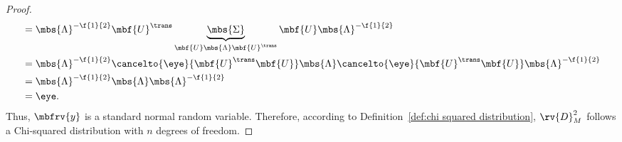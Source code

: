 \begin{proof}
\begin{align}
        &= \mbs{\Lambda}^{-\f{1}{2}}\mbf{U}^{\trans}\underbrace{\mbs{\Sigma}}_{\mbf{U}\mbs{\Lambda}\mbf{U}^{\trans}}\mbf{U}\mbs{\Lambda}^{-\f{1}{2}}\\
        &= \mbs{\Lambda}^{-\f{1}{2}}\cancelto{\eye}{\mbf{U}^{\trans}\mbf{U}}\mbs{\Lambda}\cancelto{\eye}{\mbf{U}^{\trans}\mbf{U}}\mbs{\Lambda}^{-\f{1}{2}}\\
        &= \mbs{\Lambda}^{-\f{1}{2}}\mbs{\Lambda}\mbs{\Lambda}^{-\f{1}{2}}\\
        &= \eye.
    \end{align}
    Thus, $\mbfrv{y}$ is a standard normal random variable. Therefore, according to Definition~\ref{def:chi squared distribution}, $\rv{D}_{M}^{2}$ follows a Chi-squared distribution with $n$ degrees of freedom.
\end{proof}